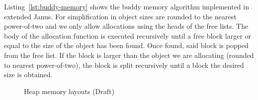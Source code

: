 

Listing~\ref{lst:buddy-memory} shows the buddy memory algorithm implemented in extended Janus. For simplification in object sizes are rounded to the nearest power-of-two and we only allow allocations using the heads of the free lists.
The body of the allocation function is executed recursively until a free block larger or equal to the size of the object has been found. Once found, said block is popped from the free list. If the block is larger than the object we are allocating (rounded to nearest power-of-two), the block is split recursively until a block the desired size is obtained.



\begin{figure}[H]
  \centering
  \caption{Heap memory layouts (Draft)}
\end{figure}